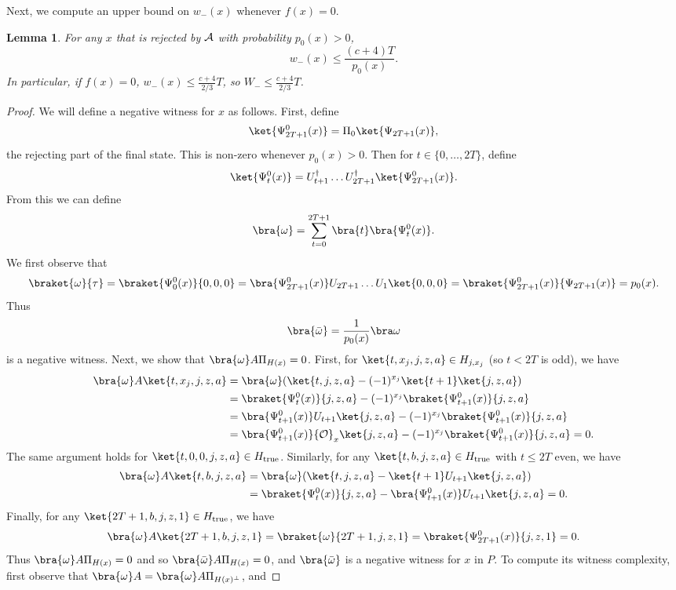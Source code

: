 \documentclass[11pt]{article}
\numberwithin{equation}{section}
\newtheorem{lemma}[theorem]{Lemma}
\theoremstyle{definition}
\theoremstyle{plain}
\begin{document}
Next, we %
compute an upper bound on  %
$w_-(x)$ whenever $f(x)=0$. %
\begin{lemma}\label{lem:alg-to-span-neg}
For any $x$ that is rejected by $\cal A$ with probability $p_0(x)>0$, 
$$w_-(x)\leq \frac{(c+4)T}{p_0(x)}.$$
In particular, if $f(x)=0$, $w_-(x)\leq \frac{c+4}{2/3}T$, so $W_-\leq \frac{c+4}{2/3}T$.
\end{lemma}
\begin{proof}
We will define a negative witness for $x$ as follows. First, define 
$$\ket{\Psi_{2T+1}^0(x)}=\Pi_0\ket{\Psi_{2T+1}(x)},$$
the rejecting part of the final state. This is non-zero whenever $p_0(x)>0$. Then for $t\in\{0,\dots,2T\}$, define
$$\ket{\Psi_t^0(x)}=U_{t+1}^\dagger\dots U_{2T+1}^\dagger \ket{\Psi_{2T+1}^0(x)}.$$
From this we can define 
$$\bra{\omega} = \sum_{t=0}^{2T+1}\bra{t}\bra{\Psi_t^0(x)}.$$
We first observe that
$$\braket{\omega}{\tau} = \braket{\Psi_0^0(x)}{0,0,0}=\bra{\Psi_{2T+1}^0(x)}U_{2T+1}\dots U_1\ket{0,0,0}=\braket{\Psi_{2T+1}^0(x)}{\Psi_{2T+1}(x)} 
=p_0(x).$$
Thus 
$$\bra{\bar\omega}=\frac{1}{p_0(x)}\bra\omega$$
is a negative witness. Next, we show that $\bra{{\omega}} A\Pi_{H(x)}=0$. First, for $\ket{t,x_j,j,z,a}\in H_{j,x_j}$ (so $t<2T$ is odd), we have
\begin{align*}
\bra{\omega}A\ket{t,x_j,j,z,a} &= \bra{\omega}(\ket{t,j,z,a}-(-1)^{x_j}\ket{t+1}\ket{j,z,a})\\
&= \braket{\Psi_t^0(x)}{j,z,a} - (-1)^{x_j}\braket{\Psi_{t+1}^0(x)}{j,z,a}\\
&= \bra{\Psi_{t+1}^0(x)}U_{t+1}\ket{j,z,a} - (-1)^{x_j}\braket{\Psi_{t+1}^0(x)}{j,z,a}\\
&= \bra{\Psi_{t+1}^0(x)}{\cal O}_x\ket{j,z,a} - (-1)^{x_j}\braket{\Psi_{t+1}^0(x)}{j,z,a} =0.
\end{align*}
The same argument holds for $\ket{t,0,0,j,z,a}\in H_{\mathrm{true}}$.
Similarly, for any $\ket{t,b,j,z,a}\in H_{\mathrm{true}}$ with $t\leq 2T$ even, we have
\begin{align*}
\bra{\omega}A\ket{t,b,j,z,a} &= \bra{\omega}(\ket{t,j,z,a}-\ket{t+1}U_{t+1}\ket{j,z,a})\\
&= \braket{\Psi_t^0(x)}{j,z,a} - \bra{\Psi_{t+1}^0(x)}U_{t+1}\ket{j,z,a}=0.
\end{align*}
Finally, for any $\ket{2T+1,b,j,z,1}\in H_{\mathrm{true}}$, we have 
$$\bra{\omega}A\ket{2T+1,b,j,z,1} = \braket{\omega}{2T+1,j,z,1}=\braket{\Psi^0_{2T+1}(x)}{j,z,1}=0.$$
Thus $\bra{\omega}A\Pi_{H(x)}=0$ and so $\bra{\bar{\omega}}A\Pi_{H(x)}=0$, and $\bra{\bar\omega}$ is a negative witness for $x$ in $P$. To compute its witness complexity, first observe that $\bra{\omega} A = \bra{\omega} A\Pi_{H(x)^\bot}$, and 

\end{proof}
\end{document}
